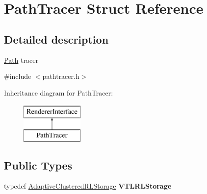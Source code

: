 \hypertarget{struct_path_tracer}{}\section{Path\+Tracer Struct Reference}
\label{struct_path_tracer}


\subsection{Detailed description}
\hyperlink{struct_path}{Path} tracer 

{\ttfamily \#include $<$pathtracer.\+h$>$}

Inheritance diagram for Path\+Tracer\+:\begin{figure}[H]
\begin{center}
\leavevmode
\includegraphics[height=2.000000cm]{struct_path_tracer}
\end{center}
\end{figure}
\subsection*{Public Types}
\begin{DoxyCompactItemize}
\item 
\mbox{\label{struct_path_tracer_aaa15005f9a89caaff352d3872168376b}} 
typedef \hyperlink{struct_adaptive_clustered_r_l_storage}{Adaptive\+Clustered\+R\+L\+Storage} {\bfseries V\+T\+L\+R\+L\+Storage}
\end{DoxyCompactItemize}
